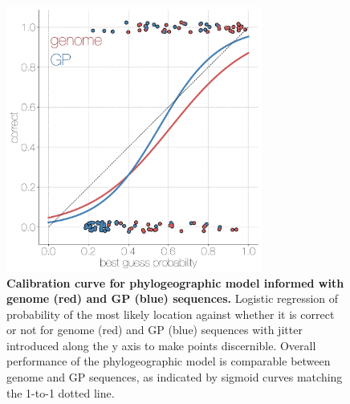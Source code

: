 \documentclass[11pt,oneside,letterpaper]{article}
\begin{document}
\begin{figure}[h]
 \centering
	\includegraphics[width=0.75\textwidth]{supp_figures/sfigX_calibration.png}
	\caption{\textbf{Calibration curve for phylogeographic model informed with genome (red) and GP (blue) sequences.}
  Logistic regression of probability of the most likely location against whether it is correct or not for genome (red) and GP (blue) sequences with jitter introduced along the y axis to make points discernible.
  Overall performance of the phylogeographic model is comparable between genome and GP sequences, as indicated by sigmoid curves matching the 1-to-1 dotted line.
	}
	\label{calibration}
\end{figure}
\end{document}
